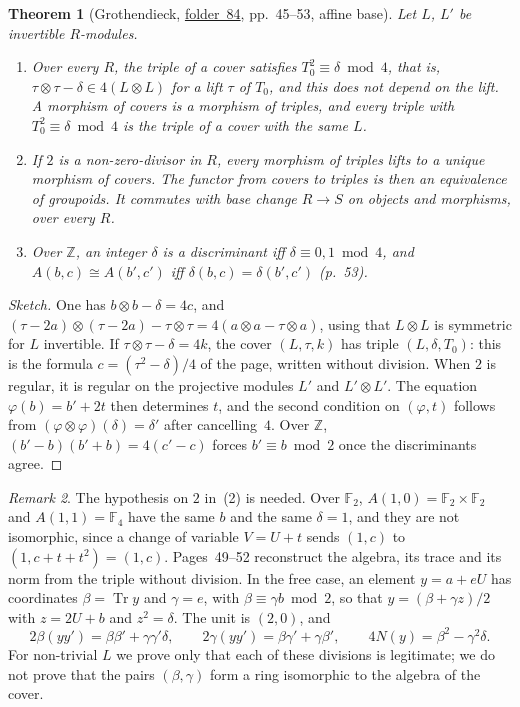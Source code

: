 \documentclass[11pt,a4paper]{amsart}
\newtheorem{theorem}{Theorem}[section]
\theoremstyle{definition}
\theoremstyle{remark}
\newtheorem{remark}[theorem]{Remark}
\newcommand{\Z}{\mathbb Z}
\newcommand{\F}{\mathbb F}
\newcommand{\Tr}{\operatorname{Tr}}
\newcommand{\fac}[1]{\href{https://grothendieck.umontpellier.fr/#1.pdf}{folder~#1}}
\begin{document}
\begin{theorem}[Grothendieck, \fac{84}, pp.~45--53, affine base]\label{thm:triples}
Let $L$, $L'$ be invertible $R$-modules.
\begin{enumerate}
\item Over every $R$, the triple of a cover satisfies $T_0^2 \equiv \delta \bmod 4$, that is, $\tau\otimes\tau - \delta \in 4(L \otimes L)$ for a lift $\tau$ of $T_0$, and this does not depend on the lift. A morphism of covers is a morphism of triples, and every triple with $T_0^2 \equiv \delta \bmod 4$ is the triple of a cover with the same $L$.
\item If $2$ is a non-zero-divisor in $R$, every morphism of triples lifts to a unique morphism of covers. The functor from covers to triples is then an equivalence of groupoids. It commutes with base change $R \to S$ on objects and morphisms, over every $R$.
\item Over $\Z$, an integer $\delta$ is a discriminant iff $\delta \equiv 0, 1 \bmod 4$, and $A(b,c) \cong A(b',c')$ iff $\delta(b,c) = \delta(b',c')$ (p.~53).
\end{enumerate}
\end{theorem}

\begin{proof}[Sketch]
One has $b\otimes b - \delta = 4c$, and $(\tau - 2a)\otimes(\tau - 2a) - \tau\otimes\tau = 4(a\otimes a - \tau \otimes a)$, using that $L \otimes L$ is symmetric for $L$ invertible. If $\tau \otimes \tau - \delta = 4k$, the cover $(L, \tau, k)$ has triple $(L, \delta, T_0)$: this is the formula $c = (\tau^2 - \delta)/4$ of the page, written without division. When $2$ is regular, it is regular on the projective modules $L'$ and $L' \otimes L'$. The equation $\varphi(b) = b' + 2t$ then determines $t$, and the second condition on $(\varphi, t)$ follows from $(\varphi\otimes\varphi)(\delta) = \delta'$ after cancelling~$4$. Over $\Z$, $(b' - b)(b' + b) = 4(c' - c)$ forces $b' \equiv b \bmod 2$ once the discriminants agree.
\end{proof}

\begin{remark}
The hypothesis on $2$ in~(2) is needed. Over $\F_2$, $A(1,0) = \F_2 \times \F_2$ and $A(1,1) = \F_4$ have the same $b$ and the same $\delta = 1$, and they are not isomorphic, since a change of variable $V = U + t$ sends $(1, c)$ to $(1, c + t + t^2) = (1, c)$. Pages~49--52 reconstruct the algebra, its trace and its norm from the triple without division. In the free case, an element $y = a + eU$ has coordinates $\beta = \Tr y$ and $\gamma = e$, with $\beta \equiv \gamma b \bmod 2$, so that $y = (\beta + \gamma z)/2$ with $z = 2U + b$ and $z^2 = \delta$. The unit is $(2, 0)$, and
\[
2\beta(yy') = \beta\beta' + \gamma\gamma'\delta, \qquad 2\gamma(yy') = \beta\gamma' + \gamma\beta', \qquad 4N(y) = \beta^2 - \gamma^2\delta.
\]
For non-trivial $L$ we prove only that each of these divisions is legitimate; we do not prove that the pairs $(\beta, \gamma)$ form a ring isomorphic to the algebra of the cover.
\end{remark}
\end{document}
